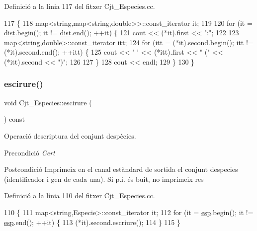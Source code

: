 Definició a la línia 117 del fitxer Cjt\+\_\+\+Especies.\+cc.


\begin{DoxyCode}
117                                                    \{
118     map<string,map<string,double>>::const\_iterator it;
119     
120     \textcolor{keywordflow}{for} (it = \hyperlink{class_cjt___especies_aaf5d15b706e8b0c5b910283d60ef58a6}{dist}.begin(); it != \hyperlink{class_cjt___especies_aaf5d15b706e8b0c5b910283d60ef58a6}{dist}.end(); ++it) \{ 
121         cout << (*it).first << \textcolor{stringliteral}{":"};
122         
123         map<string,double>::const\_iterator itt;
124         \textcolor{keywordflow}{for} (itt = (*it).second.begin(); itt != (*it).second.end(); ++itt) \{
125             cout << \textcolor{charliteral}{' '} << (*itt).first << \textcolor{stringliteral}{" ("} << (*itt).second << \textcolor{stringliteral}{")"};
126         
127         \}
128         cout << endl;
129     \}
130 \}
\end{DoxyCode}
\mbox{\label{class_cjt___especies_a6efd9dcaa89cd13823df8e6edde71603}} 
\subsubsection{\texorpdfstring{escirure()}{escirure()}}
{\footnotesize\ttfamily void Cjt\+\_\+\+Especies\+::escirure (\begin{DoxyParamCaption}{ }\end{DoxyParamCaption}) const}



Operació d\textquotesingle{}escriptura del conjunt d\textquotesingle{}espècies. 

\begin{DoxyPrecond}{Precondició}
{\itshape Cert} 
\end{DoxyPrecond}
\begin{DoxyPostcond}{Postcondició}
Imprimeix en el canal estàndard de sortida el conjunt d\textquotesingle{}especies (identificador i gen de cada una). Si p.\+i. és buit, no imprimeix res 
\end{DoxyPostcond}


Definició a la línia 110 del fitxer Cjt\+\_\+\+Especies.\+cc.


\begin{DoxyCode}
110                                   \{
111     map<string,Especie>::const\_iterator it;
112     \textcolor{keywordflow}{for} (it = \hyperlink{class_cjt___especies_aa232ab8543b78ea6d8ecaa1e5f9ccef5}{esp}.begin(); it != \hyperlink{class_cjt___especies_aa232ab8543b78ea6d8ecaa1e5f9ccef5}{esp}.end(); ++it) \{
113         (*it).second.escriure();
114     \}
115 \}
\end{DoxyCode}


